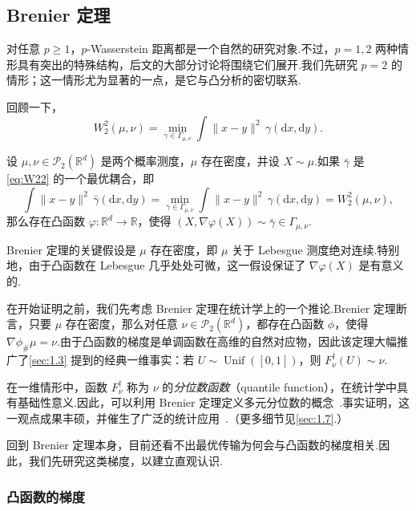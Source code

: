 \subsection{Brenier 定理}\label{sec:1.4}

对任意 $p\ge1$，$p$-Wasserstein 距离都是一个自然的研究对象.不过，$p=1,2$ 两种情形具有突出的特殊结构，后文的大部分讨论将围绕它们展开.我们先研究 $p=2$ 的情形；这一情形尤为显著的一点，是它与凸分析的密切联系.

回顾一下，
\begin{equation}\tag{$W_2^2$}\label{eq:W22}
W_2^2(\mu,\nu)=\min_{\gamma\in\Gamma_{\mu,\nu}}
\int\|x-y\|^2\,\gamma(\mathrm dx,\mathrm dy).
\end{equation}

\begin{theorem}[Brenier]\label{thm:1.8}
设 $\mu,\nu\in\mathcal P_2(\mathbb R^d)$ 是两个概率测度，$\mu$ 存在密度，并设 $X\sim\mu$.如果 $\bar\gamma$ 是 \eqref{eq:W22} 的一个最优耦合，即
$$
\int\|x-y\|^2\,\bar\gamma(\mathrm dx,\mathrm dy)
=\min_{\gamma\in\Gamma_{\mu,\nu}}\int\|x-y\|^2\,\gamma(\mathrm dx,\mathrm dy)
=W_2^2(\mu,\nu),
$$
那么存在凸函数 $\varphi:\mathbb R^d\to\mathbb R$，使得 $(X,\nabla\varphi(X))\sim\bar\gamma\in\Gamma_{\mu,\nu}$.
\end{theorem}

Brenier 定理的关键假设是 $\mu$ 存在密度，即 $\mu$ 关于 Lebesgue 测度绝对连续.特别地，由于凸函数在 Lebesgue 几乎处处可微，这一假设保证了 $\nabla\varphi(X)$ 是有意义的.

在开始证明之前，我们先考虑 Brenier 定理在统计学上的一个推论.Brenier 定理断言，只要 $\mu$ 存在密度，那么对任意 $\nu\in\mathcal P_2(\mathbb R^d)$，都存在凸函数 $\phi$，使得 $\nabla\phi_\#\mu=\nu$.由于凸函数的梯度是单调函数在高维的自然对应物，因此该定理大幅推广了\autoref{sec:1.3} 提到的经典一维事实：若 $U\sim\operatorname{Unif}([0,1])$，则 $F_\nu^\dagger(U)\sim\nu$.

在一维情形中，函数 $F_\nu^\dagger$ 称为 $\nu$ 的\emph{分位数函数}（quantile function），在统计学中具有基础性意义.因此，可以利用 Brenier 定理定义多元分位数的概念~\cite{ref75,ref160}.事实证明，这一观点成果丰硕，并催生了广泛的统计应用~\cite{ref159}.（更多细节见\autoref{sec:1.7}.）

回到 Brenier 定理本身，目前还看不出最优传输为何会与凸函数的梯度相关.因此，我们先研究这类梯度，以建立直观认识.

\subsubsection{凸函数的梯度}\label{sec:1.4.1}

